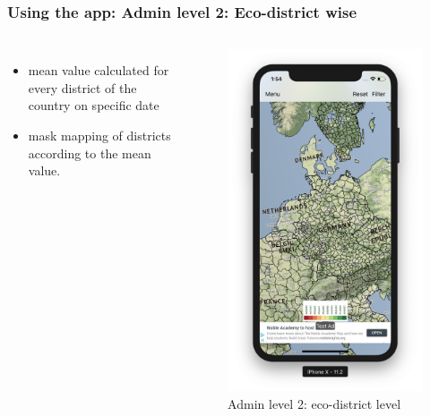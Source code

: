 \begin{frame}
\frametitle{Using the app: Admin level 2: Eco-district wise}
\begin{columns}

 \begin{itemize}
       \item mean value calculated for every district of the country on specific date
       \item mask mapping of districts according to the mean value.
   \end{itemize}

\begin{figure}
    \centering
    \begin{minipage}{.5\columnwidth}
    \includegraphics[width=1.0\linewidth]{final/figures/admin_level_2.png}
    \caption{Admin level 2: eco-district level}
    \end{minipage}
\end{figure}
\end{columns}
\end{frame}



